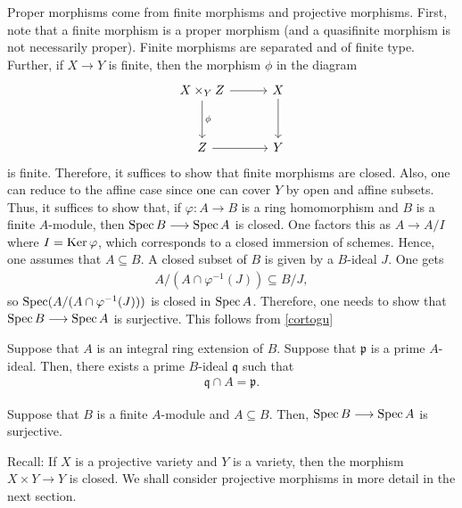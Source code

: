 \documentclass [11 pt, oneside] {article}
\begin{document}
Proper morphisms come from finite morphisms and projective morphisms. First, note that a finite morphism is a proper morphism (and a quasifinite morphism is not necessarily proper). Finite morphisms are separated and of finite type. Further, if $X\longrightarrow Y$ is finite, then the morphism $\phi$ in the diagram
\[
\begin{tikzcd}[row sep = 3 em, column sep = 3 em]
	X\times_Y Z \ar[r]\ar[d,"\phi"] &X\ar[d]\\ Z\ar[r]&Y
\end{tikzcd}
\]
is finite. Therefore, it suffices to show that finite morphisms are closed. Also, one can reduce to the affine case since one can cover $Y$ by open and affine subsets. Thus, it suffices to show that, if $\varphi: A\longrightarrow B$ is a ring homomorphism and $B$ is a finite $A$-module, then $\operatorname{Spec} B\longrightarrow \operatorname{Spec} A$ is closed. One factors this as $A\longrightarrow A/I$ where $I=\operatorname{Ker} \varphi$, which corresponds to a closed immersion of schemes. Hence, one assumes that $A\subseteq B$. A closed subset of $B$ is given by a $B$-ideal $J$. One gets
\begin{align*}
	A/(A\cap \varphi^{-1}(J)) \subseteq B/J,
\end{align*}
so $\operatorname{Spec} (A/(A\cap \varphi^{-1}(J)))$ is closed in $\operatorname{Spec} A$. Therefore, one needs to show that $\operatorname{Spec} B\longrightarrow \operatorname{Spec} A$ is surjective. This follows from \cref{cortogu}

\begin{theorem}\label{goingup}\text{}
Suppose that $A$ is an integral ring extension of $B$. Suppose that $\mathfrak{p}$ is a prime $A$-ideal. Then, there exists a prime $B$-ideal $\mathfrak{q}$ such that 
\begin{align*}
	\mathfrak{q}\cap A = \mathfrak{p}.
\end{align*}
\end{theorem}

\begin{corollary}\label{cortogu}
	Suppose that $B$ is a finite $A$-module and $A\subseteq B$. Then, $\operatorname{Spec} B\longrightarrow \operatorname{Spec} A$ is surjective. 
\end{corollary}

Recall: If $X$ is a projective variety and $Y$ is a variety, then the morphism $X\times Y\longrightarrow Y$ is closed. We shall consider projective morphisms in more detail in the next section.
\end{document}
